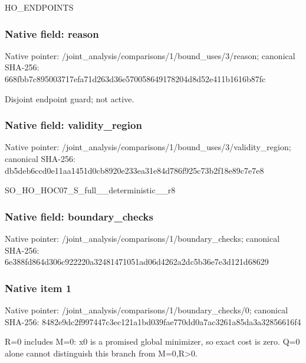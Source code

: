 \documentclass[10pt,a4paper]{article}
\begin{document}
\begingroup\raggedright\sloppy HO\_\allowbreak{}ENDPOINTS\par\endgroup

\subsubsection{Native field: reason}
Native pointer: /joint\_\allowbreak{}analysis/comparisons/1/bound\_\allowbreak{}uses/3/reason; canonical SHA-256: 668fbb7c895003717efa71d263d36e570058649178204d8d52e411b1616b87fc

\begingroup\raggedright\sloppy Disjoint endpoint guard;\allowbreak{} not active.\par\endgroup

\subsubsection{Native field: validity\_\allowbreak{}region}
Native pointer: /joint\_\allowbreak{}analysis/comparisons/1/bound\_\allowbreak{}uses/3/validity\_\allowbreak{}region; canonical SHA-256: db5deb6ccd0e11aa1451d0cb8920e233ea31e84d786f925c73b2f18e89c7e7e8

\begingroup\raggedright\sloppy SO\_\allowbreak{}HO\_\allowbreak{}HOC07\_\allowbreak{}S\_\allowbreak{}full\_\allowbreak{}\_\allowbreak{}deterministic\_\allowbreak{}\_\allowbreak{}r8\par\endgroup

\subsubsection{Native field: boundary\_\allowbreak{}checks}
Native pointer: /joint\_\allowbreak{}analysis/comparisons/1/boundary\_\allowbreak{}checks; canonical SHA-256: 6e388fd864d306c922220a32481471051ad06d4262a2dc5b36e7e3d121d68629

\subsubsection{Native item 1}
Native pointer: /joint\_\allowbreak{}analysis/comparisons/1/boundary\_\allowbreak{}checks/0; canonical SHA-256: 8482e9dc2f997447c3ec121a1bd039fae770dd0a7ac3261a85da3a32856616f4

\begingroup\raggedright\sloppy R=\allowbreak{}0 includes M=\allowbreak{}0:\allowbreak{} x0 is a promised global minimizer,\allowbreak{} so exact cost is zero. Q=\allowbreak{}0 alone cannot distinguish this branch from M=\allowbreak{}0,\allowbreak{}R>0.\par\endgroup
\end{document}
